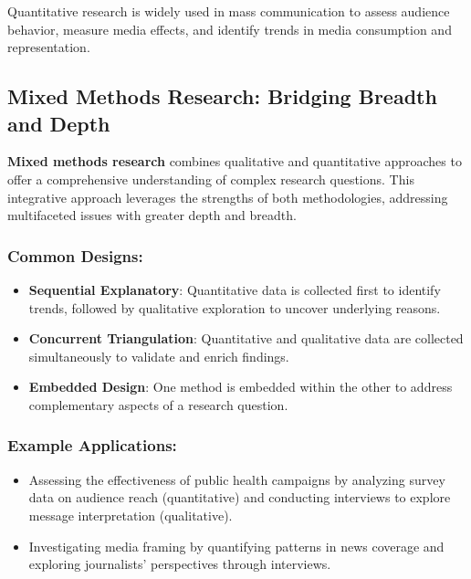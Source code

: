 \documentclass[
]{book}
\providecommand{\tightlist}{%
  \setlength{\itemsep}{0pt}\setlength{\parskip}{0pt}}
\begin{document}
Quantitative research is widely used in mass communication to assess audience behavior, measure media effects, and identify trends in media consumption and representation.

\subsection*{Mixed Methods Research: Bridging Breadth and Depth}\label{mixed-methods-research-bridging-breadth-and-depth}

\textbf{Mixed methods research} combines qualitative and quantitative approaches to offer a comprehensive understanding of complex research questions. This integrative approach leverages the strengths of both methodologies, addressing multifaceted issues with greater depth and breadth.

\subsubsection*{Common Designs:}\label{common-designs}

\begin{itemize}
\tightlist
\item
  \textbf{Sequential Explanatory}: Quantitative data is collected first to identify trends, followed by qualitative exploration to uncover underlying reasons.
\item
  \textbf{Concurrent Triangulation}: Quantitative and qualitative data are collected simultaneously to validate and enrich findings.
\item
  \textbf{Embedded Design}: One method is embedded within the other to address complementary aspects of a research question.
\end{itemize}

\subsubsection*{Example Applications:}\label{example-applications-2}

\begin{itemize}
\tightlist
\item
  Assessing the effectiveness of public health campaigns by analyzing survey data on audience reach (quantitative) and conducting interviews to explore message interpretation (qualitative).
\item
  Investigating media framing by quantifying patterns in news coverage and exploring journalists' perspectives through interviews.
\end{itemize}
\end{document}
